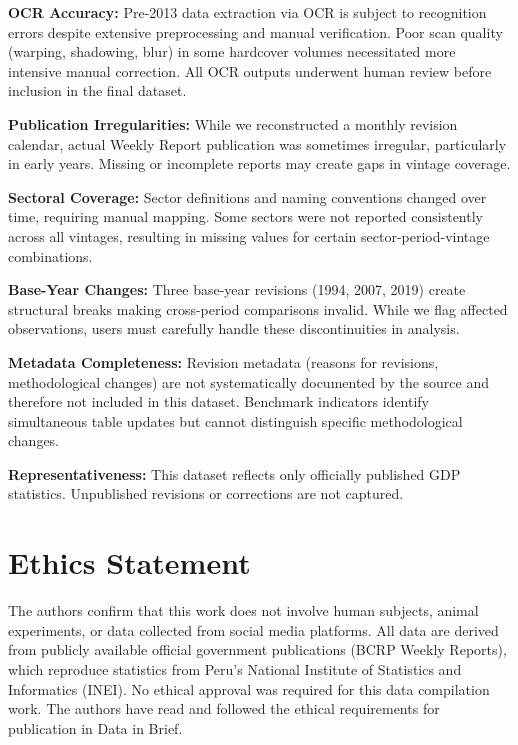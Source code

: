 \documentclass[12pt]{article}
\begin{document}
\textbf{OCR Accuracy:} Pre-2013 data extraction via OCR is subject to recognition errors despite extensive preprocessing and manual verification. Poor scan quality (warping, shadowing, blur) in some hardcover volumes necessitated more intensive manual correction. All OCR outputs underwent human review before inclusion in the final dataset.

\textbf{Publication Irregularities:} While we reconstructed a monthly revision calendar, actual Weekly Report publication was sometimes irregular, particularly in early years. Missing or incomplete reports may create gaps in vintage coverage.

\textbf{Sectoral Coverage:} Sector definitions and naming conventions changed over time, requiring manual mapping. Some sectors were not reported consistently across all vintages, resulting in missing values for certain sector-period-vintage combinations.

\textbf{Base-Year Changes:} Three base-year revisions (1994, 2007, 2019) create structural breaks making cross-period comparisons invalid. While we flag affected observations, users must carefully handle these discontinuities in analysis.

\textbf{Metadata Completeness:} Revision metadata (reasons for revisions, methodological changes) are not systematically documented by the source and therefore not included in this dataset. Benchmark indicators identify simultaneous table updates but cannot distinguish specific methodological changes.

\textbf{Representativeness:} This dataset reflects only officially published GDP statistics. Unpublished revisions or corrections are not captured.

\section*{Ethics Statement}


The authors confirm that this work does not involve human subjects, animal experiments, or data collected from social media platforms. All data are derived from publicly available official government publications (BCRP Weekly Reports), which reproduce statistics from Peru's National Institute of Statistics and Informatics (INEI). No ethical approval was required for this data compilation work. The authors have read and followed the ethical requirements for publication in Data in Brief.
\end{document}
